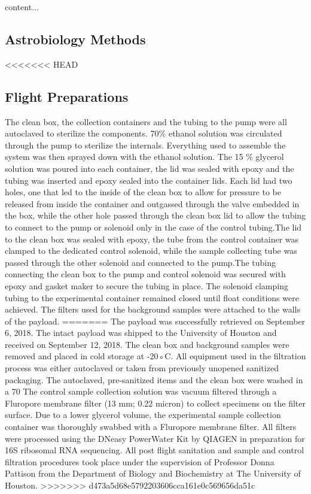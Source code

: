\begin{Document}
	content...
\end{Document}
\subsection{Astrobiology Methods}
\label{sec:Astrobiology Methods}
<<<<<<< HEAD
\subsection{ Flight Preparations }
 The clean box, the collection containers and the tubing to the pump were all autoclaved to sterilize the components. 70\% ethanol solution was circulated through the pump to sterilize the internals. Everything used to assemble the system was then sprayed down with the ethanol solution. The  15 \% glycerol solution was poured into each container, the lid was sealed with epoxy and the tubing was inserted and epoxy sealed into the container lids. Each lid had two holes, one that led to the inside of the clean box to allow for pressure to be released from inside the container and outgassed  through the valve embedded in the box, while the other hole passed through the clean box lid to allow the tubing to connect to the pump or solenoid only in the case of the control tubing.The lid to the clean box was sealed with epoxy, the tube from the control container was clamped to the dedicated control solenoid, while the sample collecting tube was passed through the other solenoid and connected to the pump.The tubing connecting the clean box to the pump and control solenoid was secured with epoxy and gasket maker to secure the tubing in place. The solenoid clamping tubing to the experimental container remained closed until float conditions were achieved. The filters used for the background samples were attached to the walls of the payload.
=======
The payload was successfully retrieved on September 6, 2018. The intact payload was shipped to the University of Houston and received on September 12, 2018. The clean box and background samples were removed and placed in cold storage at -20◦C. All equipment used in the filtration process was either autoclaved or taken from previously unopened sanitized packaging. The autoclaved, pre-sanitized items and the clean box were washed in a 70 %
The control sample collection solution was vacuum filtered through a Fluropore membrane filter (13 mm; 0.22 micron) to collect specimens on the filter surface. Due to a lower glycerol volume, the experimental sample collection container was thoroughly swabbed with a Fluropore membrane filter. All filters were processed using the DNeasy PowerWater Kit by QIAGEN in preparation for 16S ribosomal RNA sequencing. All post flight sanitation and sample and control filtration procedures took place under the supervision of Professor Donna Pattison from the Department of Biology and Biochemistry at The University of Houston.
>>>>>>> d473a5d68e5792203606cca161e0c569656da51c
